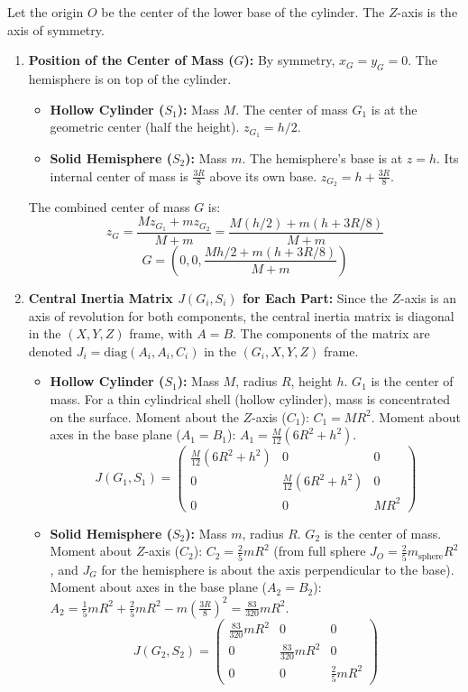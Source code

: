 \documentclass[12pt]{article}
\begin{document}
\begin{correctionbox}
Let the origin $O$ be the center of the lower base of the cylinder. The $Z$-axis is the axis of symmetry.

\begin{enumerate}
    \item \textbf{Position of the Center of Mass ($G$):}
        By symmetry, $x_G=y_G=0$. The hemisphere is on top of the cylinder.
        \begin{itemize}
            \item \textbf{Hollow Cylinder ($S_1$):} Mass $M$. The center of mass $G_1$ is at the geometric center (half the height). $z_{G_1} = h/2$.
            \item \textbf{Solid Hemisphere ($S_2$):} Mass $m$. The hemisphere's base is at $z=h$. Its internal center of mass is $\frac{3R}{8}$ above its own base. $z_{G_2} = h + \frac{3R}{8}$.
        \end{itemize}
        The combined center of mass $G$ is:
        $$z_G = \frac{M z_{G_1} + m z_{G_2}}{M+m} = \frac{M(h/2) + m(h+3R/8)}{M+m}$$
        $$G = \left(0, 0, \frac{Mh/2 + m(h+3R/8)}{M+m}\right)$$

    \item \textbf{Central Inertia Matrix $J(G_i, S_i)$ for Each Part:}
        Since the $Z$-axis is an axis of revolution for both components, the central inertia matrix is diagonal in the $(X, Y, Z)$ frame, with $A=B$. The components of the matrix are denoted $J_i = \text{diag}(A_i, A_i, C_i)$ in the $(G_i, X, Y, Z)$ frame.
        \begin{itemize}
            \item \textbf{Hollow Cylinder ($S_1$):} Mass $M$, radius $R$, height $h$. $G_1$ is the center of mass.
                For a thin cylindrical shell (hollow cylinder), mass is concentrated on the surface.
                Moment about the $Z$-axis ($C_1$): $C_1 = M R^2$.
                Moment about axes in the base plane ($A_1=B_1$): $A_1 = \frac{M}{12}(6R^2+h^2)$.
                $$J(G_1, S_1) = \begin{pmatrix} \frac{M}{12}(6R^2+h^2) & 0 & 0 \\ 0 & \frac{M}{12}(6R^2+h^2) & 0 \\ 0 & 0 & M R^2 \end{pmatrix}$$
            \item \textbf{Solid Hemisphere ($S_2$):} Mass $m$, radius $R$. $G_2$ is the center of mass.
                Moment about $Z$-axis ($C_2$): $C_2 = \frac{2}{5} m R^2$ (from full sphere $J_O=\frac{2}{5}m_{\text{sphere}}R^2$, and $J_G$ for the hemisphere is about the axis perpendicular to the base).
                Moment about axes in the base plane ($A_2=B_2$): $A_2 = \frac{1}{5} m R^2 + \frac{2}{5} m R^2 - m \left(\frac{3R}{8}\right)^2 = \frac{83}{320} m R^2$.
                $$J(G_2, S_2) = \begin{pmatrix} \frac{83}{320} m R^2 & 0 & 0 \\ 0 & \frac{83}{320} m R^2 & 0 \\ 0 & 0 & \frac{2}{5} m R^2 \end{pmatrix}$$
        \end{itemize}


\end{enumerate}
\end{correctionbox}
\end{document}
